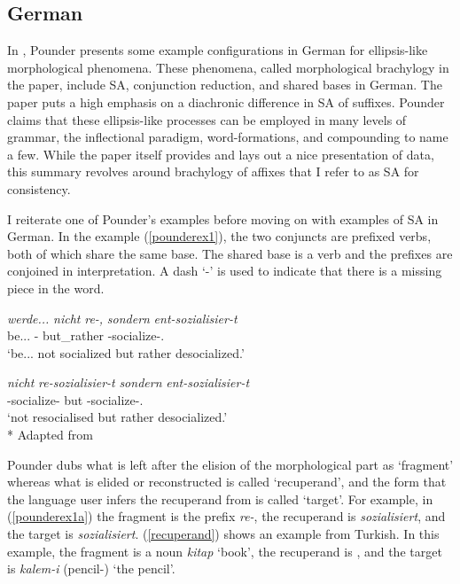 \subsection{German}

In \citet{pounder2006broken}, Pounder presents some example configurations in German for ellipsis-like morphological phenomena. These phenomena, called morphological brachylogy in the paper, include SA, conjunction reduction, and shared bases in German. The paper puts a high emphasis on a diachronic difference in SA of suffixes. Pounder claims that these ellipsis-like processes can be employed in many levels of grammar, the inflectional paradigm, word-formations, and compounding to name a few. While the paper itself provides and lays out a nice presentation of data, this summary revolves around brachylogy of affixes that I refer to as SA for consistency.

I reiterate one of Pounder's examples before moving on with examples of SA in German. In the example (\ref{pounderex1}), the two conjuncts are prefixed verbs, both of which share the same base. The shared base is a verb and the prefixes are conjoined in interpretation. A dash `-' is used to indicate that there is a missing piece in the word. 

\begin{exe}
    \ex \label{pounderex1}
    \begin{xlist}
        \ex \label{pounderex1a} 
        \gll 
        \textit{werde...} \textit{nicht} \textit{re-,} \textit{sondern} \textit{ent-sozialisier-t} \\ be... {\Neg} {\Pref}- but\_rather {\Pref}-socialize-{\Part}. \\
        \glt `be... not socialized but rather desocialized.'
    
        \ex \label{pounderex1b}
        \gll 
        \textit{nicht} \textit{re-sozialisier-t} \textit{sondern} \textit{ent-sozialisier-t} \\ {\Neg} {\Pref}-socialize-{\Part} but {\Pref}-socialize-{\Part}. \\
        \glt `not resocialised but rather desocialized.'\\*
        \hfill Adapted from \citet{pounder2006broken}
    \end{xlist}
\end{exe}

Pounder dubs what is left after the elision of the morphological part as `fragment' whereas what is elided or reconstructed is called `recuperand', and the form that the language user infers the recuperand from is called `target'. For example, in (\ref{pounderex1a}) the fragment is the prefix \textit{re-}, the recuperand is \textit{sozialisiert}, and the target is \textit{sozialisiert}. (\ref{recuperand}) shows an example from Turkish. In this example, the fragment is a noun \textit{kitap} `book', the recuperand is {\Acc}, and the target is \textit{kalem-i} (pencil-{\Acc}) `the pencil'.

